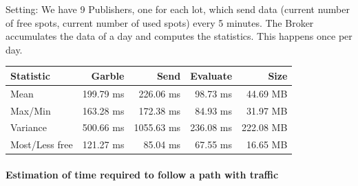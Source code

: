 
Setting: We have 9 Publishers, one for each lot, which send data (current
number of free spots, current number of used spots) every 5 minutes.  The
Broker accumulates the data of a day and computes the statistics.  This
happens once per day.



\begin{tabular}{l*{3}{r}r}
Statistic  & Garble & Send & Evaluate & Size \\
\hline
Mean       & 199.79 ms & 226.06  ms & 98.73  ms & 44.69 MB \\
Max/Min    & 163.28 ms & 172.38  ms & 84.93  ms & 31.97 MB \\
Variance   & 500.66 ms & 1055.63 ms & 236.08 ms & 222.08 MB \\
\hline
Most/Less free  & 121.27 ms & 85.04 ms & 67.55 ms & 16.65 MB \\
\end{tabular}





\paragraph{Estimation of time required to follow a path with traffic}

